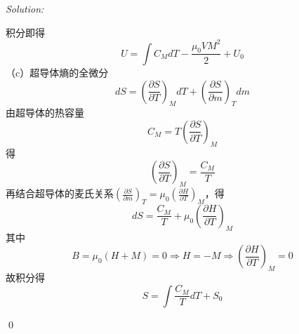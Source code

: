 \documentclass[12pt,a4paper]{article}
\newenvironment{sol}
    {\emph{Solution:}
    }
    {
    \qed
    }
\begin{document}
\begin{sol}
\begin{equation}
\end{equation}
积分即得
\begin{equation}
U=\int C_MdT-\frac{\mu_0VM^2}{2}+U_0
\end{equation}
（c）超导体熵的全微分
\begin{equation}
dS=\left(\frac{\partial S}{\partial T}\right)_MdT+\left(\frac{\partial S}{\partial m}\right)_Tdm
\end{equation}
由超导体的热容量
\begin{equation}
C_M=T\left(\frac{\partial S}{\partial T}\right)_M
\end{equation}
得
\begin{equation}
\left(\frac{\partial S}{\partial T}\right)_M=\frac{C_M}{T}
\end{equation}
再结合超导体的麦氏关系$\left(\frac{\partial S}{\partial m}\right)_T=\mu_0\left(\frac{\partial H}{\partial T}\right)_M$，得
\begin{equation}
dS=\frac{C_M}{T}+\mu_0\left(\frac{\partial H}{\partial T}\right)_M
\end{equation}
其中
\begin{equation}
B=\mu_0(H+M)=0\Longrightarrow H=-M\Longrightarrow\left(\frac{\partial H}{\partial T}\right)_M=0
\end{equation}
故积分得
\begin{equation}
S=\int\frac{C_M}{T}dT+S_0
\end{equation}
\end{sol}
\end{document}
